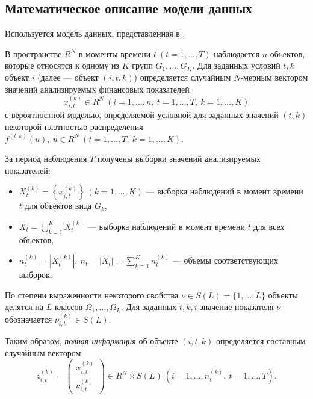 \documentclass[14pt,a4paper]{extarticle}
\begin{document}
\subsection{Математическое описание модели данных}

Используется модель данных, представленная в \cite{malugin2013}.

В пространстве $R^{N}$ в моменты времени $t\ (t=1,\ldots,T)$ наблюдается $n$ объектов, которые 
относятся к одному из $K$ групп $G_{1},\ldots,G_{K}$. Для заданных условий $t,k$ объект $i$ 
(далее --- объект $(i,t,k)$) определяется случайным $N$-мерным вектором значений анализируемых финансовых 
показателей
\[
x_{i,t}^{(k)} \in R^{N}\ (i=1,\ldots,n,\ t=1,\ldots,T,\ k=1,\ldots,K)
\]
с вероятностной моделью, определяемой условной для заданных значений $(t,k)$ некоторой плотностью распределения $f^{(t,k)}(u),\ u \in R^{N}\ (t=1,\ldots,T,\ k=1,\ldots,K)$.

За период наблюдения $T$ получены выборки значений анализируемых показателей:
\begin{itemize}
    \item $X_{t}^{(k)} = \left\{ x_{i,t}^{(k)} \right\}\ (k=1,\ldots,K)$ --- выборка наблюдений в момент времени $t$ для объектов вида $G_{k}$,
    \item $X_{t} = \bigcup_{k=1}^{K} X_{t}^{(k)}$ --- выборка наблюдений в момент времени $t$ для всех объектов,
    \item $n_{t}^{(k)} = |X_{t}^{(k)}|,\ n_{t} = |X_{t}| = \sum_{k=1}^{K} n_{t}^{(k)}$ --- объемы соответствующих выборок.
\end{itemize}

По степени выраженности некоторого свойства $\nu \in S(L) = \{1,\ldots,L\}$ объекты делятся на $L$ классов $\Omega_{1},\ldots,\Omega_{L}$. Для заданных $t,k,i$ значение показателя $\nu$ обозначается $\nu_{i,t}^{(k)} \in S(L)$.

Таким образом, \textit{полная информация} об объекте $(i,t,k)$ определяется составным случайным вектором
\begin{equation}
z_{i,t}^{(k)} = \begin{pmatrix}
x_{i,t}^{(k)} \\
\nu_{i,t}^{(k)}
\end{pmatrix} \in R^{N} \times S(L)\ (i=1,\ldots,n_{t}^{(k)},\ t=1,\ldots,T).
\end{equation}
\end{document}
